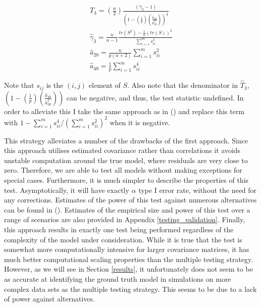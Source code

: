 \documentclass{article}
\begin{document}
\begin{align}
  \hat{T}_3 = \left(\frac{n}2{}\right)\frac{(\hat{\gamma}_3-1)}{\left(1-\left(\frac{1}{p}\right)\left(\frac{\hat{a}_{40}}{\hat{a}^2_{20}}\right)\right)^\frac{1}{2}} \label{t3} \\
  \hat{\gamma}_3 = \frac{n}{n-1}\frac{tr(S^2) - \frac{1}{n}(tr(S))^2}{\sum_{i=1}^ms^2_{ii}} \\
  \hat{a}_{20} = \frac{n}{p(n+2)}\sum_{i=1}^ms^2_{ii} \\
  \hat{a}_{40} = \frac{1}{p}\sum_{i=1}^ms^4_{ii} \label{a40}
\end{align}

Note that $s_{ij}$ is the $(i,j)$ element of $S$. Also note that the denominator in $\hat{T}_3$, $\left(1-\left(\frac{1}{p}\right)\left(\frac{\hat{a}_{40}}{\hat{a}^2_{20}}\right)\right)$ can be negative, and thus, the test statistic undefined. In order to alleviate this I take the same approach as in \citeauthor{wang2013necessary} (\citeyear{wang2013necessary}) and replace this term with $1-\sum_{i=1}^ms^4_{ii}/\left(\sum_{i=1}^ms^2_{ii}\right)^2$ when it is negative.

This strategy alleviates a number of the drawbacks of the first approach. Since this approach utilises estimated covariance rather than correlations it avoids unstable computation around the true model, where residuals are very close to zero. Therefore, we are able to test all models without making exceptions for special cases. Furthermore, it is much simpler to describe the properties of this test. Asymptotically, it will have exactly $\alpha$ type I error rate, without the need for any corrections. Estimates of the power of this test against numerous alternatives can be found in \citeauthor{wang2013necessary} (\citeyear{wang2013necessary}). Estimates of the empirical size and power of this test over a range of scenarios are also provided in Appendix \ref{testing_validation}. Finally, this approach results in exactly one test being performed regardless of the complexity of the model under consideration. While it is true that the test is somewhat more computationally intensive for larger covariance matrices, it has much better computational scaling properties than the multiple testing strategy. However, as we will see in Section \ref{results}, it unfortunately does not seem to be as accurate at identifying the ground truth model in simulations on more complex data sets as the multiple testing strategy. This seems to be due to a lack of power against alternatives.
\end{document}
